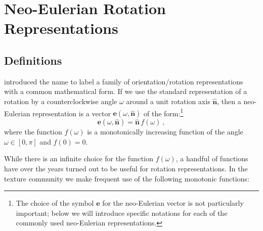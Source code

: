 \section{Neo-Eulerian Rotation Representations}\label{\chabbr:sec:neoEulerian}

\subsection{Definitions}\label{\chabbr:ssec:neodefinitions}

 introduced the name  \cite{frank1988a} to label a family of orientation/rotation representations with a common mathematical form. If we use the standard representation of a rotation by a counterclockwise angle $\omega$ around a unit rotation axis $\hat{\mathbf{n}}$, then a neo-Eulerian representation is a vector $\mathbf{e}(\omega,\hat{\mathbf{n}})$ of the form:\footnote{The choice of the symbol $\mathbf{e}$ for the neo-Eulerian vector is not particularly important; below we will introduce specific notations for each of the commonly used neo-Eulerian representations.}
\begin{equation}
	\mathbf{e}(\omega,\hat{\mathbf{n}}) = \hat{\mathbf{n}}\,f(\omega)\ ,\label{\chabbr:eq:neoEulerian}
\end{equation}
where the function $f(\omega)$ is a monotonically increasing function of the angle $\omega\in[0,\pi]$ and $f(0)=0$.  


While there is an infinite choice for the function $f(\omega)$, a handful of functions have over the years turned out to be useful for rotation representations. In the texture community we make frequent use of the following monotonic functions:

